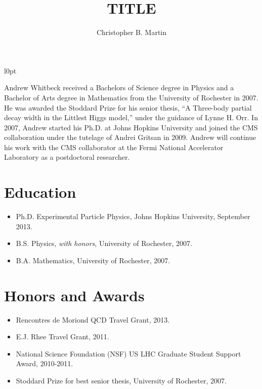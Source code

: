\documentclass[12pt,oneside,final]{thesis}
\begin{document}
\title{TITLE}
\author{Christopher B. Martin}
\dissertation
\doctorphilosophy
\copyrightnotice





%





\begin{vita}

\begin{wrapfigure}{l}{0pt}
\end{wrapfigure}

Andrew Whitbeck received a Bachelors of Science degree in
Physics and a Bachelor of Arts degree in Mathematics from
the University of Rochester in 2007.  He was awarded the
Stoddard Prize for his senior thesis, ``A Three-body partial
decay width in the Littlest Higgs model,'' under the guidance
of Lynne H. Orr.  In 2007, Andrew
started his Ph.D. at Johns Hopkins University and joined the
CMS collaboration under the tutelage of Andrei Gritsan in 2009.
Andrew will continue his work with the CMS collaborator at the
Fermi National Accelerator Laboratory as a postdoctoral
 researcher. 

\section*{Education}

\begin{itemize}
  \item Ph.D. Experimental Particle Physics, Johns Hopkins University, September 2013.
  \item B.S. Physics, \textit{with honors}, University of Rochester, 2007.
  \item B.A. Mathematics, University of Rochester, 2007.
\end{itemize}

\section*{Honors and Awards}

\begin{itemize}
\item Rencontres de Moriond QCD Travel Grant, 2013. 
\item E.J. Rhee Travel Grant, 2011.
\item National Science Foundation (NSF) US LHC Graduate Student Support Award, 2010-2011.
\item Stoddard Prize for best senior thesis, University of Rochester, 2007. 
\end{itemize}


\end{vita}
\end{document}
